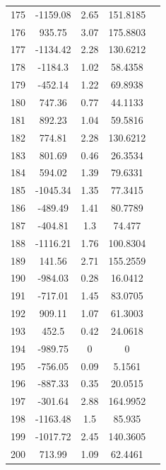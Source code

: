 {\begin{longtable}{ccccc}
175 & -1159.08 & 2.65 & 151.8185 \\ 
176 & 935.75 & 3.07 & 175.8803 \\ 
177 & -1134.42 & 2.28 & 130.6212 \\ 
178 & -1184.3 & 1.02 & 58.4358 \\ 
179 & -452.14 & 1.22 & 69.8938 \\ 
180 & 747.36 & 0.77 & 44.1133 \\ 
181 & 892.23 & 1.04 & 59.5816 \\ 
182 & 774.81 & 2.28 & 130.6212 \\ 
183 & 801.69 & 0.46 & 26.3534 \\ 
184 & 594.02 & 1.39 & 79.6331 \\ 
185 & -1045.34 & 1.35 & 77.3415 \\ 
186 & -489.49 & 1.41 & 80.7789 \\ 
187 & -404.81 & 1.3 & 74.477 \\ 
188 & -1116.21 & 1.76 & 100.8304 \\ 
189 & 141.56 & 2.71 & 155.2559 \\ 
190 & -984.03 & 0.28 & 16.0412 \\ 
191 & -717.01 & 1.45 & 83.0705 \\ 
192 & 909.11 & 1.07 & 61.3003 \\ 
193 & 452.5 & 0.42 & 24.0618 \\ 
194 & -989.75 & 0 & 0 \\ 
195 & -756.05 & 0.09 & 5.1561 \\ 
196 & -887.33 & 0.35 & 20.0515 \\ 
197 & -301.64 & 2.88 & 164.9952 \\ 
198 & -1163.48 & 1.5 & 85.935 \\ 
199 & -1017.72 & 2.45 & 140.3605 \\ 
200 & 713.99 & 1.09 & 62.4461 \\ \hline
\end{longtable}
}


